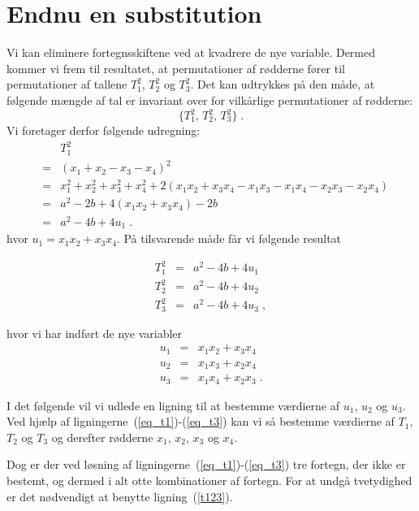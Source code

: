 \documentclass[12pt,oneside,a4paper]{article}
\newcommand{\bas}{\begin{eqnarray*}}
\newcommand{\eas}{\end{eqnarray*}}
\newcommand{\bea}{\begin{eqnarray}}
\newcommand{\eea}{\end{eqnarray}}
\begin{document}
\section{Endnu en substitution}
Vi kan eliminere fortegnsskiftene ved at kvadrere de nye variable. Dermed
kommer vi frem til resultatet, at permutationer af rødderne fører til
permutationer af tallene $T_1^2$, $T_2^2$ og $T_3^2$. Det kan udtrykkes på den
måde, at følgende mængde af tal er invariant over for vilkårlige permutationer
af rødderne:
\begin{equation}
    \{T_1^2,\, T_2^2,\, T_3^2\}\;.
    \label{n_set}
\end{equation}
Vi foretager derfor følgende udregning:
\bas
&& T_1^2 \\
&=& (x_1+x_2-x_3-x_4)^2 \\
&=& x_1^2+x_2^2+x_3^2+x_4^2 + 2(x_1x_2+x_3x_4-x_1x_3-x_1x_4-x_2x_3-x_2x_4) \\
&=& a^2-2b + 4(x_1x_2+x_3x_4) - 2b \\
&=& a^2-4b + 4u_1 \;.
\eas
hvor $u_1 = x_1x_2+x_3x_4$.
På tilsvarende måde får vi følgende resultat
\begin{tcolorbox}
\bea
T_1^2 &=& a^2-4b + 4u_1 \label{eq_t1}\\
T_2^2 &=& a^2-4b + 4u_2 \label{eq_t2}\\
T_3^2 &=& a^2-4b + 4u_3 \label{eq_t3}\;,
\eea
\end{tcolorbox}
hvor vi har indført de nye variabler
\bea
u_1 &=& x_1x_2 + x_3x_4 \label{eq_u1_def}\\
u_2 &=& x_1x_3 + x_2x_4 \label{eq_u2_def}\\
u_3 &=& x_1x_4 + x_2x_3 \label{eq_u3_def}\;.
\eea

I det følgende vil vi udlede en ligning til at bestemme værdierne af $u_1$,
$u_2$ og $u_3$. Ved hjælp af ligningerne~(\ref{eq_t1})-(\ref{eq_t3}) kan vi 
så bestemme værdierne af $T_1$, $T_2$ og $T_3$ og derefter rødderne $x_1$, 
$x_2$, $x_3$ og $x_4$.

Dog er der ved løsning af ligningerne~(\ref{eq_t1})-(\ref{eq_t3}) tre fortegn,
der ikke er bestemt, og dermed i alt otte kombinationer af fortegn.
For at undgå tvetydighed er det nødvendigt at benytte ligning~(\ref{t123}).
\end{document}
